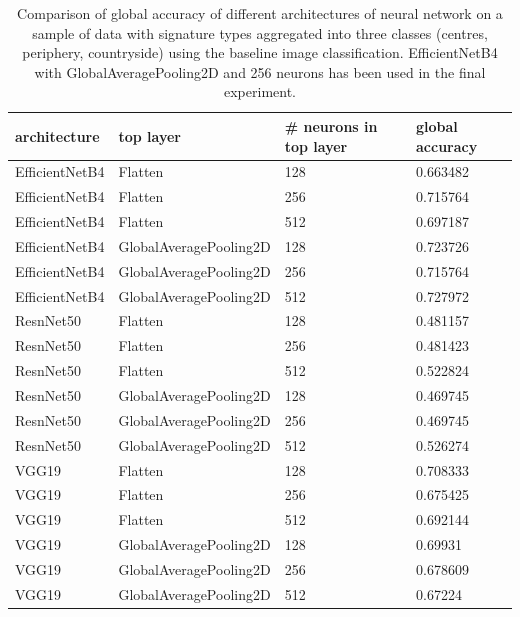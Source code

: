 \begin{table}[H]
    \centering
\begin{tabular}{llll}
    \toprule
    architecture & top layer & \# neurons in top layer &       global accuracy \\
    \midrule
    EfficientNetB4 &   Flatten &                    128 &  0.663482 \\
    EfficientNetB4 &   Flatten &                    256 &  0.715764 \\
    EfficientNetB4 &   Flatten &                    512 &  0.697187 \\
    EfficientNetB4 &   GlobalAveragePooling2D &                    128 &  0.723726 \\
    EfficientNetB4 &   GlobalAveragePooling2D &                    256 &  0.715764 \\
    EfficientNetB4 &   GlobalAveragePooling2D &                    512 &  0.727972 \\
        ResnNet50 &   Flatten &                    128 &  0.481157 \\
        ResnNet50 &   Flatten &                    256 &  0.481423 \\
        ResnNet50 &   Flatten &                    512 &  0.522824 \\
        ResnNet50 &   GlobalAveragePooling2D &                    128 &  0.469745 \\
        ResnNet50 &   GlobalAveragePooling2D &                    256 &  0.469745 \\
        ResnNet50 &   GlobalAveragePooling2D &                    512 &  0.526274 \\
           VGG19 &   Flatten &                    128 &  0.708333 \\
           VGG19 &   Flatten &                    256 &  0.675425 \\
           VGG19 &   Flatten &                    512 &  0.692144 \\
           VGG19 &   GlobalAveragePooling2D &                    128 &   0.69931 \\
           VGG19 &   GlobalAveragePooling2D &                    256 &  0.678609 \\
           VGG19 &   GlobalAveragePooling2D &                    512 &   0.67224 \\
    \bottomrule
    \end{tabular}
\caption{\label{tab:app_nns}\footnotesize Comparison of global accuracy of different
architectures of neural network on a sample of data with signature types aggregated into
three classes (centres, periphery, countryside) using the baseline image classification.
EfficientNetB4 with GlobalAveragePooling2D and 256 neurons has been used in the final
experiment.}
\end{table}


